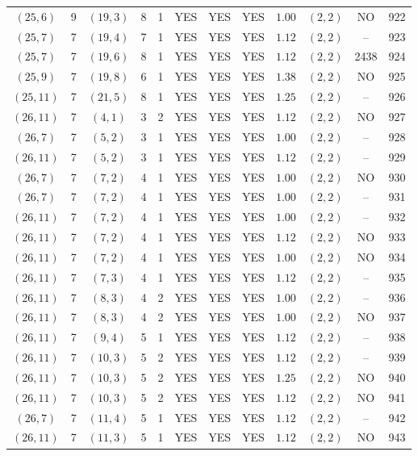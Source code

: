 \begin{longtable}{|c|c|c|c|c|c|c|c|c|c|c|c|}
$(25,6)$ & 9 & $(19,3)$ & 8 & 1 & YES & YES & YES & $1.00$ & $(2,2)$ & NO & 922\\
$(25,7)$ & 7 & $(19,4)$ & 7 & 1 & YES & YES & YES & $1.12$ & $(2,2)$ & -- & 923\\
$(25,7)$ & 7 & $(19,6)$ & 8 & 1 & YES & YES & YES & $1.12$ & $(2,2)$ & 2438 & 924\\
$(25,9)$ & 7 & $(19,8)$ & 6 & 1 & YES & YES & YES & $1.38$ & $(2,2)$ & NO & 925\\
$(25,11)$ & 7 & $(21,5)$ & 8 & 1 & YES & YES & YES & $1.25$ & $(2,2)$ & -- & 926\\
$(26,11)$ & 7 & $(4,1)$ & 3 & 2 & YES & YES & YES & $1.12$ & $(2,2)$ & NO & 927\\
$(26,7)$ & 7 & $(5,2)$ & 3 & 1 & YES & YES & YES & $1.00$ & $(2,2)$ & -- & 928\\
$(26,11)$ & 7 & $(5,2)$ & 3 & 1 & YES & YES & YES & $1.12$ & $(2,2)$ & -- & 929\\
$(26,7)$ & 7 & $(7,2)$ & 4 & 1 & YES & YES & YES & $1.00$ & $(2,2)$ & NO & 930\\
$(26,7)$ & 7 & $(7,2)$ & 4 & 1 & YES & YES & YES & $1.00$ & $(2,2)$ & -- & 931\\
$(26,11)$ & 7 & $(7,2)$ & 4 & 1 & YES & YES & YES & $1.00$ & $(2,2)$ & -- & 932\\
$(26,11)$ & 7 & $(7,2)$ & 4 & 1 & YES & YES & YES & $1.12$ & $(2,2)$ & NO & 933\\
$(26,11)$ & 7 & $(7,2)$ & 4 & 1 & YES & YES & YES & $1.00$ & $(2,2)$ & NO & 934\\
$(26,11)$ & 7 & $(7,3)$ & 4 & 1 & YES & YES & YES & $1.12$ & $(2,2)$ & -- & 935\\
$(26,11)$ & 7 & $(8,3)$ & 4 & 2 & YES & YES & YES & $1.00$ & $(2,2)$ & -- & 936\\
$(26,11)$ & 7 & $(8,3)$ & 4 & 2 & YES & YES & YES & $1.00$ & $(2,2)$ & NO & 937\\
$(26,11)$ & 7 & $(9,4)$ & 5 & 1 & YES & YES & YES & $1.12$ & $(2,2)$ & -- & 938\\
$(26,11)$ & 7 & $(10,3)$ & 5 & 2 & YES & YES & YES & $1.12$ & $(2,2)$ & -- & 939\\
$(26,11)$ & 7 & $(10,3)$ & 5 & 2 & YES & YES & YES & $1.25$ & $(2,2)$ & NO & 940\\
$(26,11)$ & 7 & $(10,3)$ & 5 & 2 & YES & YES & YES & $1.12$ & $(2,2)$ & NO & 941\\
$(26,7)$ & 7 & $(11,4)$ & 5 & 1 & YES & YES & YES & $1.12$ & $(2,2)$ & -- & 942\\
$(26,11)$ & 7 & $(11,3)$ & 5 & 1 & YES & YES & YES & $1.12$ & $(2,2)$ & NO & 943\\

\end{longtable}
